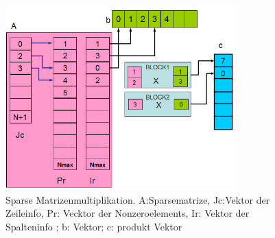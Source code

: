 


\begin{figure}[htbp]
\includegraphics[width=3.5in]{.//pic//sparseMul}
\caption{Sparse Matrizenmultiplikation. A:Sparsematrize, Jc:Vektor der Zeileinfo, Pr: Vecktor der Nonzeroelements, Ir: Vektor der Spalteninfo ; b: Vektor; c: produkt Vektor}
\label{sparseMul} 
\end{figure}